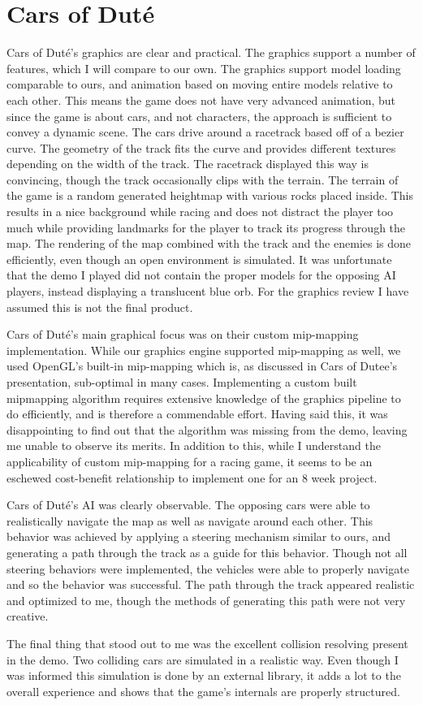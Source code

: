 \section{Cars of Dut\'e}
Cars of Dut\'e's graphics are clear and practical. The graphics support a number of features, which I will compare to our own. The graphics support model loading comparable to ours, and animation based on moving entire models relative to each other. This means the game does not have very advanced animation, but since the game is about cars, and not characters, the approach is sufficient to convey a dynamic scene. The cars drive around a racetrack based off of a bezier curve. The geometry of the track fits the curve and provides different textures depending on the width of the track. The racetrack displayed this way is convincing, though the track occasionally clips with the terrain. The terrain of the game is a random generated heightmap with various rocks placed inside. This results in a nice background while racing and does not distract the player too much while providing landmarks for the player to track its progress through the map. The rendering of the map combined with the track and the enemies is done efficiently, even though an open environment is simulated. It was unfortunate that the demo I played did not contain the proper models for the opposing AI players, instead displaying a translucent blue orb. For the graphics review I have assumed this is not the final product.

Cars of Dut\'e's main graphical focus was on their custom mip-mapping implementation. While our graphics engine supported mip-mapping as well, we used OpenGL's built-in mip-mapping which is, as discussed in Cars of Dutee's presentation, sub-optimal in many cases. Implementing a custom built mipmapping algorithm requires extensive knowledge of the graphics pipeline to do efficiently, and is therefore a commendable effort. Having said this, it was disappointing to find out that the algorithm was missing from the demo, leaving me unable to observe its merits. In addition to this, while I understand the applicability of custom mip-mapping for a racing game, it seems to be an eschewed cost-benefit relationship to implement one for an 8 week project.

Cars of Dut\'e's AI was clearly observable. The opposing cars were able to realistically navigate the map as well as navigate around each other. This behavior was achieved by applying a steering mechanism similar to ours, and generating a path through the track as a guide for this behavior. Though not all steering behaviors were implemented, the vehicles were able to properly navigate and so the behavior was successful. The path through the track appeared realistic and optimized to me, though the methods of generating this path were not very creative.

The final thing that stood out to me was the excellent collision resolving present in the demo. Two colliding cars are simulated in a realistic way. Even though I was informed this simulation is done by an external library, it adds a lot to the overall experience and shows that the game's internals are properly structured.